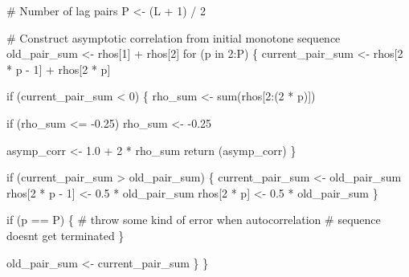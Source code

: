 \documentclass[
  letterpaper,
  DIV=11,
  numbers=noendperiod]{scrartcl}
\newenvironment{Shaded}{\begin{snugshade}}{\end{snugshade}}
\newcommand{\CommentTok}[1]{\textcolor[rgb]{0.37,0.37,0.37}{#1}}
\newcommand{\ControlFlowTok}[1]{\textcolor[rgb]{0.00,0.23,0.31}{#1}}
\newcommand{\DecValTok}[1]{\textcolor[rgb]{0.68,0.00,0.00}{#1}}
\newcommand{\FloatTok}[1]{\textcolor[rgb]{0.68,0.00,0.00}{#1}}
\newcommand{\FunctionTok}[1]{\textcolor[rgb]{0.28,0.35,0.67}{#1}}
\newcommand{\NormalTok}[1]{\textcolor[rgb]{0.00,0.23,0.31}{#1}}
\newcommand{\OtherTok}[1]{\textcolor[rgb]{0.00,0.23,0.31}{#1}}
\newcommand{\SpecialCharTok}[1]{\textcolor[rgb]{0.37,0.37,0.37}{#1}}
\begin{document}
\begin{Shaded}
\begin{Highlighting}[]
  \CommentTok{\# Number of lag pairs}
\NormalTok{  P }\OtherTok{\textless{}{-}}\NormalTok{ (L }\SpecialCharTok{+} \DecValTok{1}\NormalTok{) }\SpecialCharTok{/} \DecValTok{2}

  \CommentTok{\# Construct asymptotic correlation from initial monotone sequence}
\NormalTok{  old\_pair\_sum }\OtherTok{\textless{}{-}}\NormalTok{ rhos[}\DecValTok{1}\NormalTok{] }\SpecialCharTok{+}\NormalTok{ rhos[}\DecValTok{2}\NormalTok{]}
  \ControlFlowTok{for}\NormalTok{ (p }\ControlFlowTok{in} \DecValTok{2}\SpecialCharTok{:}\NormalTok{P) \{}
\NormalTok{    current\_pair\_sum }\OtherTok{\textless{}{-}}\NormalTok{ rhos[}\DecValTok{2} \SpecialCharTok{*}\NormalTok{ p }\SpecialCharTok{{-}} \DecValTok{1}\NormalTok{] }\SpecialCharTok{+}\NormalTok{ rhos[}\DecValTok{2} \SpecialCharTok{*}\NormalTok{ p]}
  
    \ControlFlowTok{if}\NormalTok{ (current\_pair\_sum }\SpecialCharTok{\textless{}} \DecValTok{0}\NormalTok{) \{}
\NormalTok{      rho\_sum }\OtherTok{\textless{}{-}} \FunctionTok{sum}\NormalTok{(rhos[}\DecValTok{2}\SpecialCharTok{:}\NormalTok{(}\DecValTok{2} \SpecialCharTok{*}\NormalTok{ p)])}
    
      \ControlFlowTok{if}\NormalTok{ (rho\_sum }\SpecialCharTok{\textless{}=} \SpecialCharTok{{-}}\FloatTok{0.25}\NormalTok{)}
\NormalTok{        rho\_sum }\OtherTok{\textless{}{-}} \SpecialCharTok{{-}}\FloatTok{0.25}
    
\NormalTok{      asymp\_corr }\OtherTok{\textless{}{-}} \FloatTok{1.0} \SpecialCharTok{+} \DecValTok{2} \SpecialCharTok{*}\NormalTok{ rho\_sum}
      \FunctionTok{return}\NormalTok{ (asymp\_corr)}
\NormalTok{    \}}
  
    \ControlFlowTok{if}\NormalTok{ (current\_pair\_sum }\SpecialCharTok{\textgreater{}}\NormalTok{ old\_pair\_sum) \{}
\NormalTok{      current\_pair\_sum }\OtherTok{\textless{}{-}}\NormalTok{ old\_pair\_sum}
\NormalTok{      rhos[}\DecValTok{2} \SpecialCharTok{*}\NormalTok{ p }\SpecialCharTok{{-}} \DecValTok{1}\NormalTok{] }\OtherTok{\textless{}{-}} \FloatTok{0.5} \SpecialCharTok{*}\NormalTok{ old\_pair\_sum}
\NormalTok{      rhos[}\DecValTok{2} \SpecialCharTok{*}\NormalTok{ p] }\OtherTok{\textless{}{-}} \FloatTok{0.5} \SpecialCharTok{*}\NormalTok{ old\_pair\_sum}
\NormalTok{    \}}
  
    \ControlFlowTok{if}\NormalTok{ (p }\SpecialCharTok{==}\NormalTok{ P) \{}
      \CommentTok{\# throw some kind of error when autocorrelation}
      \CommentTok{\# sequence doesn\textquotesingle{}t get terminated}
\NormalTok{    \}}
  
\NormalTok{    old\_pair\_sum }\OtherTok{\textless{}{-}}\NormalTok{ current\_pair\_sum}
\NormalTok{  \}}
\NormalTok{\}}
\end{Highlighting}
\end{Shaded}
\end{document}

